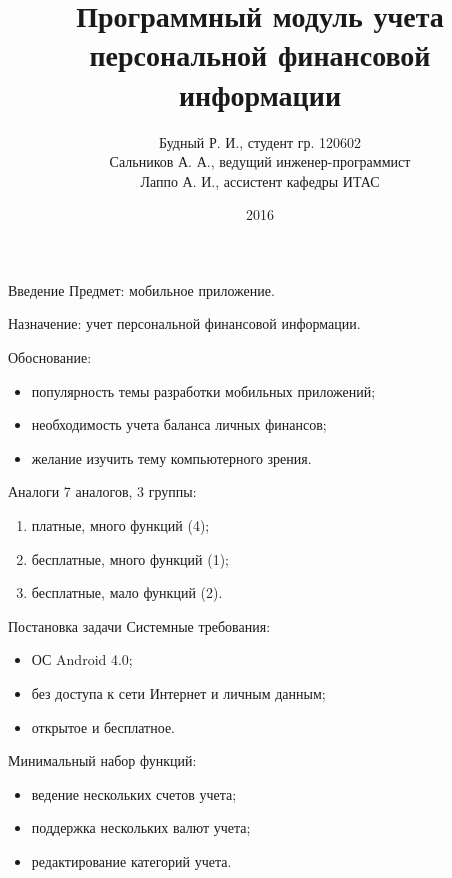 \documentclass[hyperref={pdftex,unicode}]{beamer}
\title{Программный модуль учета персональной финансовой информации}
\author{%
  Будный Р. И., студент гр. 120602 \\
  Сальников А. А., ведущий инженер-программист \\
  Лаппо А. И., ассистент кафедры ИТАС
}
\date{2016}
\begin{document}
\begin{frame}
  \maketitle
\end{frame}

\begin{frame}{Введение}
  Предмет: мобильное приложение.

  \smallskip
  Назначение: учет персональной финансовой информации.

  \smallskip
  Обоснование:
  \begin{itemize}
  \item популярность темы разработки мобильных приложений;
  \item необходимость учета баланса личных финансов;
  \item желание изучить тему компьютерного зрения.
  \end{itemize}
\end{frame}

\begin{frame}{Аналоги}
  7 аналогов, 3 группы:
  \begin{enumerate}
    \item платные, много функций (4);
    \item бесплатные, много функций (1);
    \item бесплатные, мало функций (2).
  \end{enumerate}
\end{frame}

\begin{frame}{Постановка задачи}
  Системные требования:
  \begin{itemize}
    \item ОС Android 4.0;
    \item без доступа к сети Интернет и личным данным;
    \item открытое и бесплатное.
  \end{itemize}

  \smallskip
  Минимальный набор функций:
  \begin{itemize}
  \item ведение нескольких счетов учета;
  \item поддержка нескольких валют учета;
  \item редактирование категорий учета.
  \end{itemize}
\end{frame}
\end{document}

